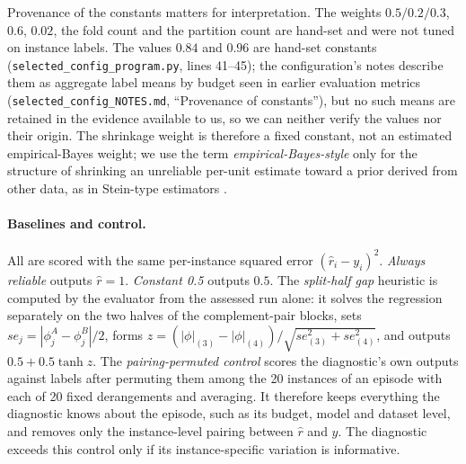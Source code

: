 \documentclass{article}
\newcommand{\rhat}{\hat r}
\begin{document}
Provenance of the constants matters for interpretation. The weights $0.5/0.2/0.3$, $0.6$, $0.02$, the fold count and the partition count are hand-set and were not tuned on instance labels. The values $0.84$ and $0.96$ are hand-set constants (\texttt{selected\_config\_program.py}, lines 41--45); the configuration's notes describe them as aggregate label means by budget seen in earlier evaluation metrics (\texttt{selected\_config\_NOTES.md}, ``Provenance of constants''), but no such means are retained in the evidence available to us, so we can neither verify the values nor their origin. The shrinkage weight is therefore a fixed constant, not an estimated empirical-Bayes weight; we use the term \emph{empirical-Bayes-style} only for the structure of shrinking an unreliable per-unit estimate toward a prior derived from other data, as in Stein-type estimators \citep{Efron1973Stein}.

\paragraph{Baselines and control.}
All are scored with the same per-instance squared error $(\rhat_i-y_i)^2$. \emph{Always reliable} outputs $\rhat=1$. \emph{Constant 0.5} outputs $0.5$. The \emph{split-half gap} heuristic is computed by the evaluator from the assessed run alone: it solves the regression separately on the two halves of the complement-pair blocks, sets $se_j=|\phi^A_j-\phi^B_j|/2$, forms $z=(|\phi|_{(3)}-|\phi|_{(4)})/\sqrt{se_{(3)}^2+se_{(4)}^2}$, and outputs $0.5+0.5\tanh z$. The \emph{pairing-permuted control} scores the diagnostic's own outputs against labels after permuting them among the 20 instances of an episode with each of 20 fixed derangements and averaging. It therefore keeps everything the diagnostic knows about the episode, such as its budget, model and dataset level, and removes only the instance-level pairing between $\rhat$ and $y$. The diagnostic exceeds this control only if its instance-specific variation is informative.
\end{document}
